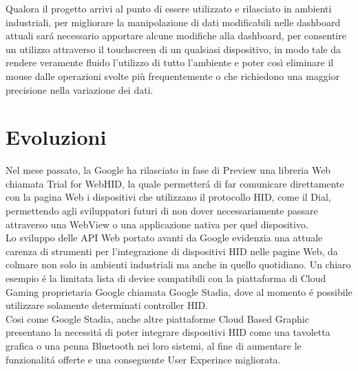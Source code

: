 Qualora il progetto arrivi al punto di essere utilizzato e rilasciato in ambienti industriali, per migliorare la manipolazione di dati modificabili nelle dashboard attuali sará necessario apportare alcune modifiche alla dashboard, per consentire un utilizzo attraverso il touchscreen di un qualsiasi dispositivo, in modo tale da rendere veramente fluido l’utilizzo di tutto l’ambiente e poter così eliminare il mouse dalle operazioni svolte più frequentemente o che richiedono una maggior precisione nella variazione dei dati.\\



\section{Evoluzioni}

Nel mese passato, la Google ha rilasciato in fase di Preview una libreria Web chiamata Trial for WebHID, la quale permetterá di far comunicare direttamente con la pagina Web i dispositivi che utilizzano il protocollo HID, come il Dial, permettendo agli sviluppatori futuri di non dover necessariamente passare attraverso una WebView o una applicazione nativa per quel dispositivo.\\

Lo sviluppo delle API Web portato avanti da Google evidenzia una attuale carenza di strumenti per l'integrazione di dispositivi HID nelle pagine Web, da colmare non solo in ambienti industriali ma anche in quello quotidiano. Un chiaro esempio é la limitata lista di device compatibili con la piattaforma di Cloud Gaming proprietaria Google chiamata Google Stadia\cite{gs}, dove al momento é possibile utilizzare solamente determinati controller HID.\\

Cosi come Google Stadia, anche altre piattaforme Cloud Based Graphic presentano la necessitá di poter integrare dispositivi HID come una tavoletta grafica o una penna Bluetooth nei loro sistemi, al fine di aumentare le funzionalitá offerte e una conseguente User Experince migliorata.\\
